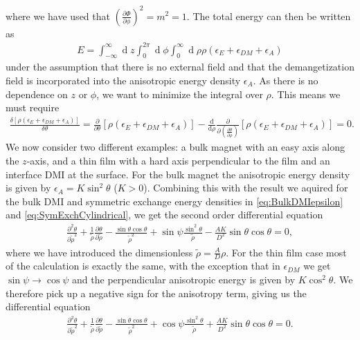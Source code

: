 \documentclass[12pt, a4paper, twoside, openright]{article}		%
\renewcommand{\d}[1]{\ensuremath{\operatorname{d}\!{#1}}}
\numberwithin{equation}{section}
\begin{document}
where we have used that $(\frac{\partial\Phi}{\partial\phi})^2=m^2=1$. The total energy can then be written as
\begin{align}
E = \int_{-\infty}^{\infty}\d z \int_0^{2\pi} \d\phi\int_0^{\infty} \d\rho \rho \left(\epsilon_E + \epsilon_{DM} + \epsilon_A\right)
\end{align}
under the assumption that there is no external field and that the demangetization field is incorporated into the anisotropic energy density $\epsilon_A$. As there is no dependence on $z$ or $\phi$, we want to minimize the integral over $\rho$. This means we must require
\begin{align}
\frac{\delta \left[\rho\left(\epsilon_E+\epsilon_{DM}+\epsilon_A\right)\right]}{\delta\theta} = \frac{\partial}{\partial\theta}\left[\rho\left(\epsilon_E+\epsilon_{DM}+\epsilon_A\right)\right] - \frac{\textrm{d}}{\textrm{d}\rho} \frac{\partial}{\partial(\frac{\partial \theta}{\partial\rho})}\left[\rho\left(\epsilon_E+\epsilon_{DM}+\epsilon_A\right)\right] = 0.
\end{align}
We now consider two different examples: a bulk magnet with an easy axis along the $z$-axis, and a thin film with a hard axis perpendicular to the film and an interface DMI at the surface. For the bulk magnet the anisotropic energy density is given by $\epsilon_A = K\sin^2\theta$ ($K>0$). Combining this with the result we aquired for the bulk DMI and symmetric exchange energy densities in \eqref{eq:BulkDMIepsilon} and \eqref{eq:SymExchCylindrical}, we get the second order differential equation
\begin{align}
\label{eq:ODEthetaBulk}
\frac{\partial^2\theta}{\partial\tilde{\rho}^2} + \frac{1}{\tilde{\rho}}\frac{\partial\theta}{\partial\tilde{\rho}} - \frac{\sin\theta\cos\theta}{\tilde{\rho}^2}+\sin\psi\frac{\sin^2\theta}{\tilde{\rho}}-\frac{AK}{D^2}\sin\theta\cos\theta = 0,
\end{align}
where we have introduced the dimensionless $\tilde{\rho} = \frac{A}{D}\rho$. For the thin film case most of the calculation is exactly the same, with the exception that in $\epsilon_{DM}$ we get $\sin\psi\rightarrow\cos\psi$ and the perpendicular anisotropic energy is given by $K\cos^2\theta$. We therefore pick up a negative sign for the anisotropy term, giving us the differential equation
\begin{align}
\label{eq:ODEthetaFilm}
\frac{\partial^2\theta}{\partial\tilde{\rho}^2} + \frac{1}{\tilde{\rho}}\frac{\partial\theta}{\partial\tilde{\rho}} - \frac{\sin\theta\cos\theta}{\tilde{\rho}^2}+\cos\psi\frac{\sin^2\theta}{\tilde{\rho}}+\frac{AK}{D^2}\sin\theta\cos\theta = 0.
\end{align}
\end{document}
